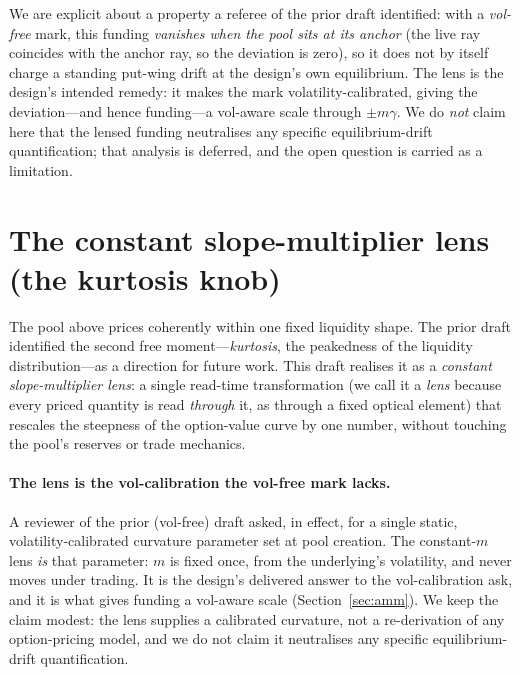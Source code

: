 \documentclass[11pt]{article}
\begin{document}
We are explicit about a property a referee of the prior draft identified: with a
\emph{vol-free} mark, this funding \emph{vanishes when the pool sits at its
anchor} (the live ray coincides with the anchor ray, so the deviation is zero), so
it does not by itself charge a standing put-wing drift at the design's own
equilibrium. The lens is the design's intended remedy: it makes the mark
volatility-calibrated, giving the deviation---and hence funding---a vol-aware
scale through $\pm m\gamma$. We do \emph{not} claim here that the lensed funding
neutralises any specific equilibrium-drift quantification; that analysis is
deferred, and the open question is carried as a limitation.

\section{The constant slope-multiplier lens (the kurtosis knob)}\label{sec:lens}

The pool above prices coherently within one fixed liquidity shape. The prior
draft identified the second free moment---\emph{kurtosis}, the peakedness of the
liquidity distribution---as a direction for future work. This draft realises it
as a \emph{constant slope-multiplier lens}: a single read-time transformation
(we call it a \emph{lens} because every priced quantity is read \emph{through} it,
as through a fixed optical element) that rescales the steepness of the
option-value curve by one number, without touching the pool's reserves or trade
mechanics.

\paragraph{The lens is the vol-calibration the vol-free mark lacks.}
A reviewer of the prior (vol-free) draft asked, in effect, for a single static,
volatility-calibrated curvature parameter set at pool creation. The constant-$m$
lens \emph{is} that parameter: $m$ is fixed once, from the underlying's
volatility, and never moves under trading. It is the design's delivered answer to
the vol-calibration ask, and it is what gives funding a vol-aware scale
(Section~\ref{sec:amm}). We keep the claim modest: the lens supplies a calibrated
curvature, not a re-derivation of any option-pricing model, and we do not claim it
neutralises any specific equilibrium-drift quantification.
\end{document}

